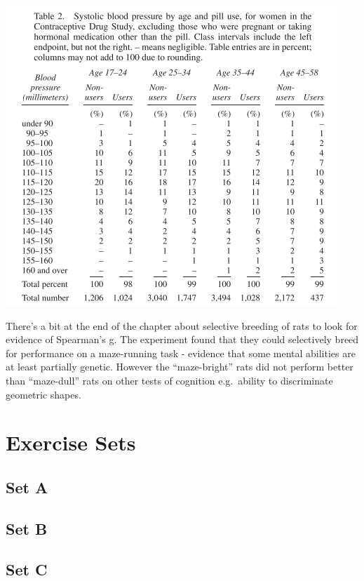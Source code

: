 \documentclass[
]{book}
\begin{document}
\includegraphics{images/Ch03Img06.png}

There's a bit at the end of the chapter about selective breeding of rats to look for evidence of Spearman's g. The experiment found that they could selectively breed for performance on a maze-running task - evidence that some mental abilities are at least partially genetic. However the ``maze-bright'' rats did not perform better than ``maze-dull'' rats on other tests of cognition e.g.~ability to discriminate geometric shapes.

\hypertarget{exercise-sets-1}{%
\section{Exercise Sets}\label{exercise-sets-1}}

\hypertarget{set-a-1}{%
\subsection*{Set A}\label{set-a-1}}

\hypertarget{set-b}{%
\subsection*{Set B}\label{set-b}}

\hypertarget{set-c}{%
\subsection*{Set C}\label{set-c}}
\end{document}
